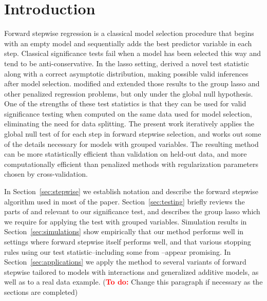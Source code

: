\documentclass{imsart}
\newcommand{\todo}{\textcolor{red}{\textbf{To do: }}}
\begin{document}
\section{Introduction}
\label{sec:intro}

Forward stepwise regression is a classical model selection procedure
that begins with an empty model and sequentially adds the best predictor
variable in each step. Classical significance tests fail
when a model
has been selected this way and tend to be anti-conservative.
In the lasso setting, \cite{significance:lasso} derived a novel test
statistic along with a correct asymptotic distribution, making possible
valid inferences after model selection.
\cite{tests:adaptive} modified and extended those results to the
group lasso \citep{grouplasso} and other penalized regression
problems, but only under the global null hypothesis.
One of the strengths of these test statistics is that they can be
used for valid significance testing when computed on the same
data used for model selection, eliminating the need for data splitting.
The present work iteratively applies the global null test
of \cite{tests:adaptive} for each step in forward stepwise selection,
and works out some of the details necessary for
models with grouped variables. The resulting method can
be more statistically efficient than validation on held-out data, and
more computationally efficient than penalized methods with
regularization parameters chosen by cross-validation.


In Section~\ref{sec:stepwise} we establish notation and describe the
forward stepwise algorithm used in most of the paper.
Section~\ref{sec:testing} briefly reviews
the parts of \cite{significance:lasso} and \cite{tests:adaptive}
relevant to our significance test, and describes the group lasso which
we require for applying the test with grouped variables.
Simulation results in Section~\ref{sec:simulations} show
empirically that our method performs well in settings where forward
stepwise itself performs well, and that
various stopping rules using our test statistic--including
some from \cite{sequential:fdr}--appear promising. In
Section~\ref{sec:applications} we apply
the method to several variants of forward
stepwise tailored to models with interactions and generalized additive
models, as well as to a real data example.
(\todo Change this paragraph if necessary as the sections are completed)
\end{document}
